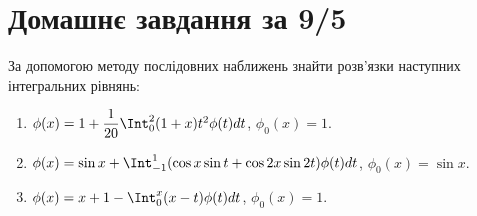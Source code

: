 \section{Домашнє завдання за 9/5}

\begin{problem}
    За допомогою методу послідовних наближень знайти розв'язки наступних інтегральних рівнянь:
    \begin{enumerate}
        \item $\phi(x) = 1 + \dfrac{1}{20} \Int_0^2 (1 + x) t^2 \phi(t) dt$, $\phi_0(x) = 1$.
        \item $\phi(x) = \sin x + \Int_{-1}^1 (\cos x\sin t + \cos 2x \sin 2t) \phi(t) dt$, $\phi_0(x) = \sin x$.
        \item $\phi(x) = x + 1 - \Int_0^x (x - t) \phi(t) dt$, $\phi_0(x) = 1$.
    \end{enumerate}
\end{problem}

